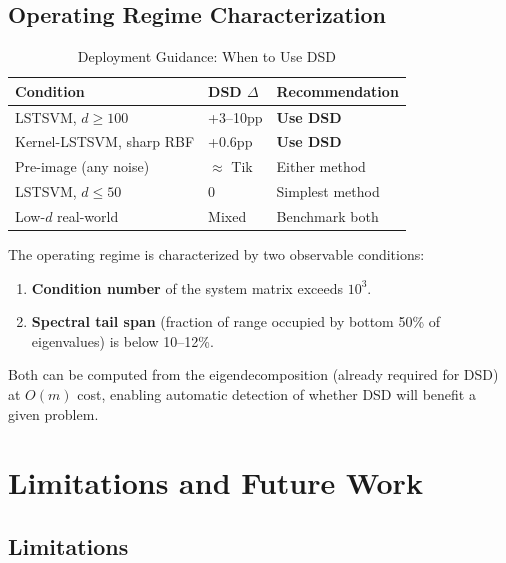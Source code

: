 \documentclass[journal]{IEEEtran}
\begin{document}
\subsection{Operating Regime Characterization}

\begin{table}[!t]
\centering
\caption{Deployment Guidance: When to Use DSD}
\label{tab:regime_summary}
\begin{tabular}{@{}p{3.5cm}p{1.5cm}p{2.5cm}@{}}
\toprule
\textbf{Condition} & \textbf{DSD $\Delta$} & \textbf{Recommendation} \\
\midrule
LSTSVM, $d \geq 100$ & +3--10pp & \textbf{Use DSD} \\
Kernel-LSTSVM, sharp RBF & +0.6pp & \textbf{Use DSD} \\
Pre-image (any noise) & $\approx$ Tik & Either method \\
LSTSVM, $d \leq 50$ & 0 & Simplest method \\
Low-$d$ real-world & Mixed & Benchmark both \\
\bottomrule
\end{tabular}
\end{table}

The operating regime is characterized by two observable conditions:
\begin{enumerate}
\item \textbf{Condition number} of the system matrix exceeds $10^3$.
\item \textbf{Spectral tail span} (fraction of range occupied by bottom 50\% of eigenvalues) is below 10--12\%.
\end{enumerate}
Both can be computed from the eigendecomposition (already required for DSD) at $O(m)$ cost, enabling automatic detection of whether DSD will benefit a given problem.


\section{Limitations and Future Work}
\label{sec:limitations}

\subsection{Limitations}
\end{document}
